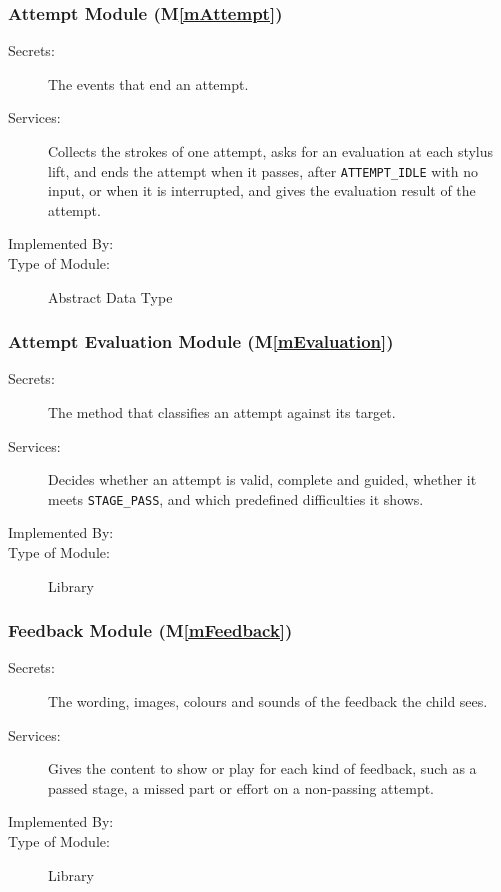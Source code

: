 \documentclass[12pt, titlepage]{article}
\newcommand{\mref}[1]{M\ref{#1}}
\begin{document}
\subsubsection{Attempt Module (\mref{mAttempt})}

\begin{description}
\item[Secrets:] The events that end an attempt.
\item[Services:] Collects the strokes of one attempt, asks for an evaluation at
  each stylus lift, and ends the attempt when it passes, after
  \texttt{ATTEMPT\_IDLE} with no input, or when it is interrupted, and gives
  the evaluation result of the attempt.
\item[Implemented By:] \progname{}
\item[Type of Module:] Abstract Data Type
\end{description}

\subsubsection{Attempt Evaluation Module (\mref{mEvaluation})}

\begin{description}
\item[Secrets:] The method that classifies an attempt against its target.
\item[Services:] Decides whether an attempt is valid, complete and guided,
  whether it meets \texttt{STAGE\_PASS}, and which predefined difficulties it
  shows.
\item[Implemented By:] \progname{}
\item[Type of Module:] Library
\end{description}

\subsubsection{Feedback Module (\mref{mFeedback})}

\begin{description}
\item[Secrets:] The wording, images, colours and sounds of the feedback the
  child sees.
\item[Services:] Gives the content to show or play for each kind of feedback,
  such as a passed stage, a missed part or effort on a non-passing attempt.
\item[Implemented By:] \progname{}
\item[Type of Module:] Library
\end{description}
\end{document}
